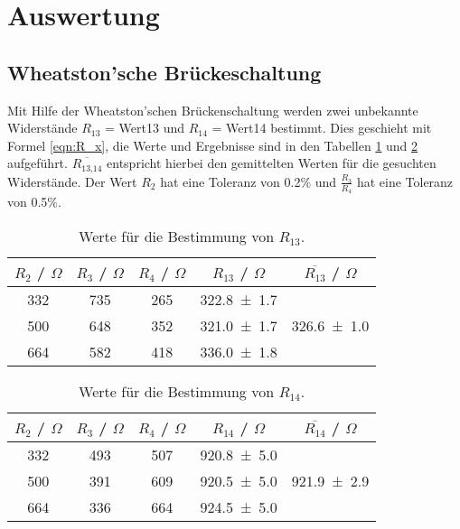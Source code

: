 \section{Auswertung}
\label{sec:Auswertung}

\subsection{Wheatston'sche Brückeschaltung}
Mit Hilfe der Wheatston'schen Brückenschaltung werden zwei unbekannte Widerstände $R_{13}$ = Wert13 und $R_{14}$ = Wert14 bestimmt. Dies geschieht mit Formel \ref{eqn:R_x}, die Werte und Ergebnisse sind in den Tabellen \ref{tab:Wheat1} und \ref{tab:Wheat2} aufgeführt. $\overline{R_\text{13,14}}$ entspricht hierbei den gemittelten Werten für die gesuchten Widerstände. Der Wert $R_2$ hat eine Toleranz von 0.2\% und $\frac{R_3}{R_4}$ hat eine Toleranz von 0.5\%.

\begin{table}[H] %
  \centering
  \begin{tabular}{c c c c c}
    \toprule
    $R_2$ / $\Omega$ & $R_3$ / $\Omega$ & $R_4$ / $\Omega$ & $R_{13}$ / $\Omega$ & $\overline{R_{13}}$ / $\Omega$ \\
    \midrule
    332 & 735 & 265 & \num{322.8 +- 1.7} &  \\
    500 & 648 & 352 & \num{321.0 +- 1.7} &  \num{326.6 +- 1.0}\\
    664 & 582 & 418 & \num{336.0 +- 1.8} &  \\
  \end{tabular}
  \caption{Werte für die Bestimmung von $R_{13}$.}
  \label{tab:Wheat1}
\end{table}

\begin{table}[H] %
  \centering
  \begin{tabular}{c c c c c}
    \toprule
    $R_2$ / $\Omega$ & $R_3$ / $\Omega$ & $R_4$ / $\Omega$ & $R_{14}$ / $\Omega$ & $\overline{R_{14}}$ / $\Omega$ \\
    \midrule
    332 & 493 & 507 & \num{920.8 +- 5.0} &  \\
    500 & 391 & 609 & \num{920.5 +- 5.0} &  \num{921.9 +- 2.9}\\
    664 & 336 & 664 & \num{924.5 +- 5.0} &  \\
  \end{tabular}
  \caption{Werte für die Bestimmung von $R_{14}$.}
  \label{tab:Wheat2}
\end{table}

